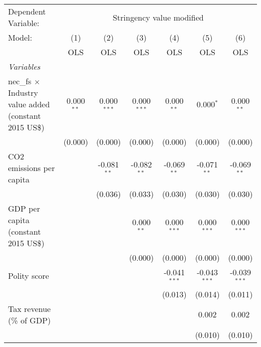 
\begingroup
\centering
\begin{tabular}{lcccccc}
   \toprule
   Dependent Variable: & \multicolumn{6}{c}{Stringency value modified}\\
   Model:                                                        & (1)          & (2)           & (3)           & (4)            & (5)            & (6)\\  
                                                                 &  OLS         & OLS           & OLS           & OLS            & OLS            & OLS\\  
   \midrule
   \emph{Variables}\\
   nec\_fs $\times$ Industry value added (constant 2015 US\$)    & 0.000$^{**}$ & 0.000$^{***}$ & 0.000$^{***}$ & 0.000$^{**}$   & 0.000$^{*}$    & 0.000$^{**}$\\   
                                                                 & (0.000)      & (0.000)       & (0.000)       & (0.000)        & (0.000)        & (0.000)\\   
   CO2 emissions per capita                                      &              & -0.081$^{**}$ & -0.082$^{**}$ & -0.069$^{**}$  & -0.071$^{**}$  & -0.069$^{**}$\\   
                                                                 &              & (0.036)       & (0.033)       & (0.030)        & (0.030)        & (0.030)\\   
   GDP per capita (constant 2015 US\$)                           &              &               & 0.000$^{**}$  & 0.000$^{***}$  & 0.000$^{***}$  & 0.000$^{***}$\\   
                                                                 &              &               & (0.000)       & (0.000)        & (0.000)        & (0.000)\\   
   Polity score                                                  &              &               &               & -0.041$^{***}$ & -0.043$^{***}$ & -0.039$^{***}$\\   
                                                                 &              &               &               & (0.013)        & (0.014)        & (0.011)\\   
   Tax revenue (\% of GDP)                                       &              &               &               &                & 0.002          & 0.002\\   
                                                                 &              &               &               &                & (0.010)        & (0.010)\\   

\end{tabular}
